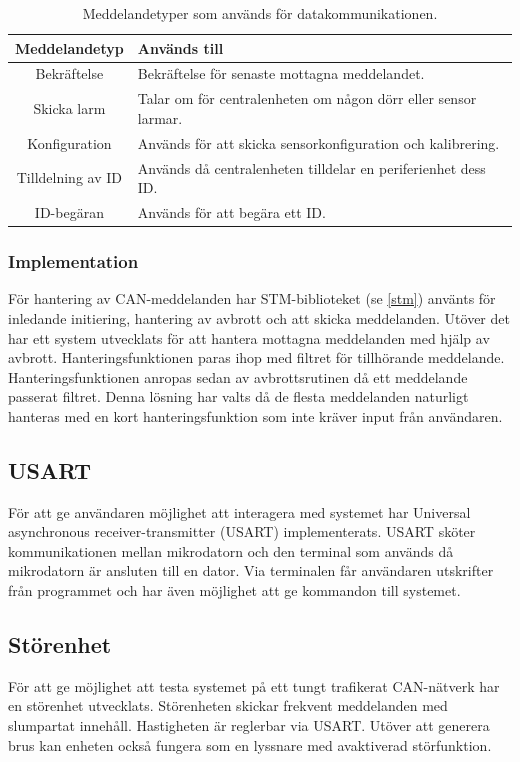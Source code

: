 \documentclass{article}
\begin{document}
\begin{table}[H]
	\centering
	\begin{tabular}{|c|p{}|}
		\hline
		Meddelandetyp & Används till \\ \hline \hline
		Bekräftelse		& Bekräftelse för senaste mottagna meddelandet. \\ \hline
		Skicka larm		& Talar om för centralenheten om någon dörr eller sensor larmar. \\ \hline
		Konfiguration		& Används för att skicka sensorkonfiguration och kalibrering. \\ \hline
		Tilldelning av ID		& Används då centralenheten tilldelar en periferienhet dess ID. \\ \hline
		ID-begäran		& Används för att begära ett ID. \\ \hline

	\end{tabular}
	\caption{Meddelandetyper som används för datakommunikationen.}
	\label{tab:meddelandetyper}
\end{table}


\subsubsection{Implementation}
För hantering av CAN-meddelanden har STM-biblioteket (se \ref{stm}) använts för inledande initiering,
hantering av avbrott och att skicka meddelanden.
Utöver det har ett system utvecklats för att hantera mottagna meddelanden med hjälp av avbrott.
Hanteringsfunktionen paras ihop med filtret för tillhörande meddelande.
Hanteringsfunktionen anropas sedan av avbrottsrutinen då ett meddelande passerat filtret.
Denna lösning har valts då de flesta meddelanden naturligt hanteras med en kort hanteringsfunktion
som inte kräver input från användaren.


\subsection{USART}
För att ge användaren möjlighet att interagera med systemet har Universal asynchronous receiver-transmitter (USART) implementerats. USART sköter kommunikationen mellan mikrodatorn och den terminal som används då mikrodatorn är ansluten till en dator. Via terminalen får användaren utskrifter från programmet och har även möjlighet att ge kommandon till systemet.


\subsection{Störenhet}
För att ge möjlighet att testa systemet på ett tungt trafikerat CAN-nätverk har en störenhet utvecklats. Störenheten skickar frekvent meddelanden med slumpartat innehåll. Hastigheten är reglerbar via USART. Utöver att generera brus kan enheten också fungera som en lyssnare med avaktiverad störfunktion.
\end{document}
